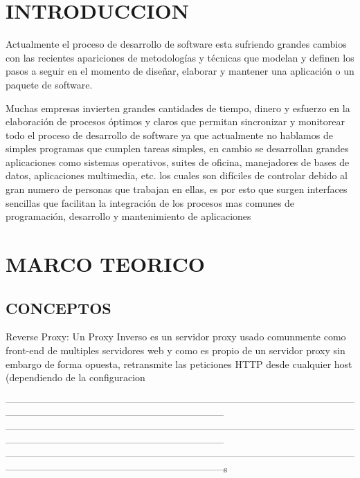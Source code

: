 \documentclass[12pt,letterpaper,oneside]{article}
\begin{document}
\section{INTRODUCCION}

Actualmente el proceso de desarrollo de software esta sufriendo grandes
cambios con las recientes apariciones de metodologías y técnicas
que modelan y definen los pasos a seguir en el momento de diseñar,
elaborar y mantener una aplicación o un paquete de software.

Muchas empresas invierten grandes cantidades de tiempo, dinero y
esfuerzo en la elaboración de procesos óptimos y claros que
permitan sincronizar y monitorear todo el proceso de desarrollo de
software ya que actualmente no hablamos de simples programas que
cumplen tareas simples, en cambio se desarrollan grandes aplicaciones
como sistemas operativos, suites de oficina, manejadores de bases de
datos, aplicaciones multimedia, etc. los cuales son difíciles de
controlar debido al gran numero de personas que trabajan en ellas, es
por esto que surgen interfaces sencillas que facilitan la integración
de los procesos mas comunes de programación, desarrollo y
mantenimiento de aplicaciones

\newpage\section{MARCO TEORICO}
\newpage\subsection{CONCEPTOS}
Reverse Proxy:
Un Proxy Inverso es un servidor proxy usado comunmente como front-end de multiples servidores web
y como es propio de un servidor proxy sin embargo de forma opuesta, retransmite las peticiones HTTP
desde cualquier host (dependiendo de la configuracion



--------------------------------------------------------------------------------------------------------------------------------------------------------------------------------
--------------------------------------------------------------------------------------------------------------------------------------------------------------------------------
--------------------------------------------------------------------------------------------------------------------------------------------------------------------------------s
\end{document}
